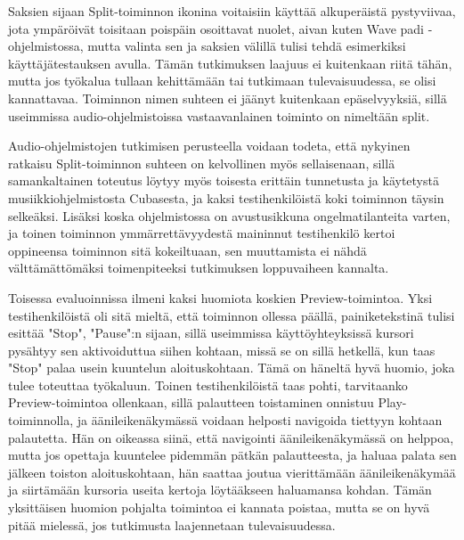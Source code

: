 \documentclass[utf8]{gradu3}
\begin{document}
Saksien sijaan Split-toiminnon ikonina voitaisiin käyttää alkuperäistä pystyviivaa, jota ympäröivät toisitaan poispäin osoittavat nuolet, aivan kuten Wave padi -ohjelmistossa, mutta valinta sen ja saksien välillä tulisi tehdä esimerkiksi käyttäjätestauksen avulla. Tämän tutkimuksen laajuus ei kuitenkaan riitä tähän, mutta jos työkalua tullaan kehittämään tai tutkimaan tulevaisuudessa, se olisi kannattavaa. Toiminnon nimen suhteen ei jäänyt kuitenkaan epäselvyyksiä, sillä useimmissa audio-ohjelmistoissa vastaavanlainen toiminto on nimeltään split.

Audio-ohjelmistojen tutkimisen perusteella voidaan todeta, että nykyinen ratkaisu Split-toiminnon suhteen on kelvollinen myös sellaisenaan, sillä samankaltainen toteutus löytyy myös toisesta erittäin tunnetusta ja käytetystä musiikkiohjelmistosta Cubasesta, ja kaksi testihenkilöistä koki toiminnon täysin selkeäksi. Lisäksi koska ohjelmistossa on avustusikkuna ongelmatilanteita varten, ja toinen toiminnon ymmärrettävyydestä maininnut testihenkilö kertoi oppineensa toiminnon sitä kokeiltuaan, sen muuttamista ei nähdä välttämättömäksi toimenpiteeksi tutkimuksen loppuvaiheen kannalta. 

Toisessa evaluoinnissa ilmeni kaksi huomiota koskien Preview-toimintoa. Yksi testihenkilöistä oli sitä mieltä, että toiminnon ollessa päällä, painiketekstinä tulisi esittää "Stop", "Pause":n sijaan, sillä useimmissa käyttöyhteyksissä kursori pysähtyy sen aktivoiduttua siihen kohtaan, missä se on sillä hetkellä, kun taas "Stop" palaa usein kuuntelun aloituskohtaan. Tämä on häneltä hyvä huomio, joka tulee toteuttaa työkaluun. Toinen testihenkilöistä taas pohti, tarvitaanko Preview-toimintoa ollenkaan, sillä palautteen toistaminen onnistuu Play-toiminnolla, ja äänileikenäkymässä voidaan helposti navigoida tiettyyn kohtaan palautetta. Hän on oikeassa siinä, että navigointi äänileikenäkymässä on helppoa, mutta jos opettaja kuuntelee pidemmän pätkän palautteesta, ja haluaa palata sen jälkeen toiston aloituskohtaan, hän saattaa joutua vierittämään äänileikenäkymää ja siirtämään kursoria useita kertoja löytääkseen haluamansa kohdan. Tämän yksittäisen huomion pohjalta toimintoa ei kannata poistaa, mutta se on hyvä pitää mielessä, jos tutkimusta laajennetaan tulevaisuudessa.
\end{document}
